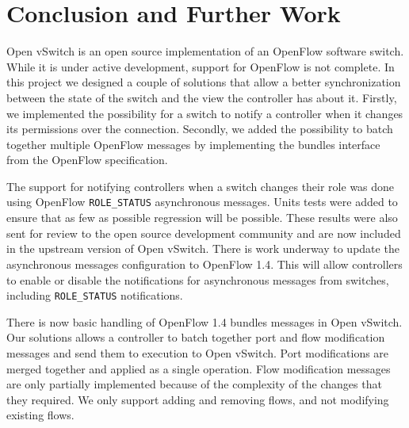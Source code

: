 \chapter{Conclusion and Further Work}
\label{chapter:conclusion}  
 

Open vSwitch is an open source implementation of an OpenFlow software switch. While it is under active development,
support for OpenFlow is not complete. In this project we designed a couple of solutions that allow a better
synchronization between the state of the switch and the view the controller has about it. Firstly, we implemented
the possibility for a switch to notify a controller when it changes its permissions over the connection. Secondly,
we added the possibility to batch together multiple OpenFlow messages by implementing the bundles interface
from the OpenFlow specification.

The support for notifying controllers when a switch changes their role was done using OpenFlow \texttt{ROLE_STATUS}
asynchronous messages. Units tests were added to ensure that as few as possible regression will be possible.
These results were also sent for review to the open source development community and are now included in the
upstream version of Open vSwitch. There is work underway to update the asynchronous messages configuration to
OpenFlow 1.4. This will allow controllers to enable or disable the notifications for asynchronous messages
from switches, including \texttt{ROLE_STATUS} notifications.

There is now basic handling of OpenFlow 1.4 bundles messages in Open vSwitch. Our solutions allows a controller
to batch together port and flow modification messages and send them to execution to Open vSwitch. Port modifications
are merged together and applied as a single operation. Flow modification messages are only partially implemented
because of the complexity of the changes that they required. We only support adding and removing flows, and not
modifying existing flows.


